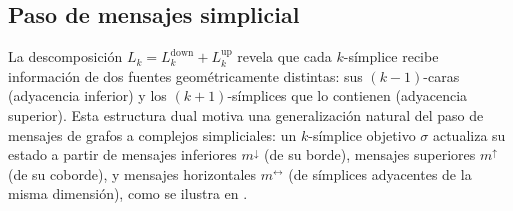 \subsection{Paso de mensajes simplicial}
\label{sec:graphs:simplicial-mp}

La descomposici\'on $L_k = L_k^{\mathrm{down}} + L_k^{\mathrm{up}}$ revela que
cada $k$-s\'implice recibe informaci\'on de dos fuentes geom\'etricamente
distintas: sus $(k{-}1)$-caras (adyacencia inferior) y los
$(k{+}1)$-s\'implices que lo contienen (adyacencia superior). Esta estructura
dual motiva una generalizaci\'on natural del paso de mensajes de grafos a
complejos simpliciales: un $k$-s\'implice objetivo $\sigma$ actualiza su estado a
partir de mensajes inferiores $m^{\downarrow}$ (de su borde), mensajes superiores
$m^{\uparrow}$ (de su coborde), y mensajes horizontales $m^{\leftrightarrow}$ (de
s\'implices adyacentes de la misma dimensi\'on), como se ilustra en
.

